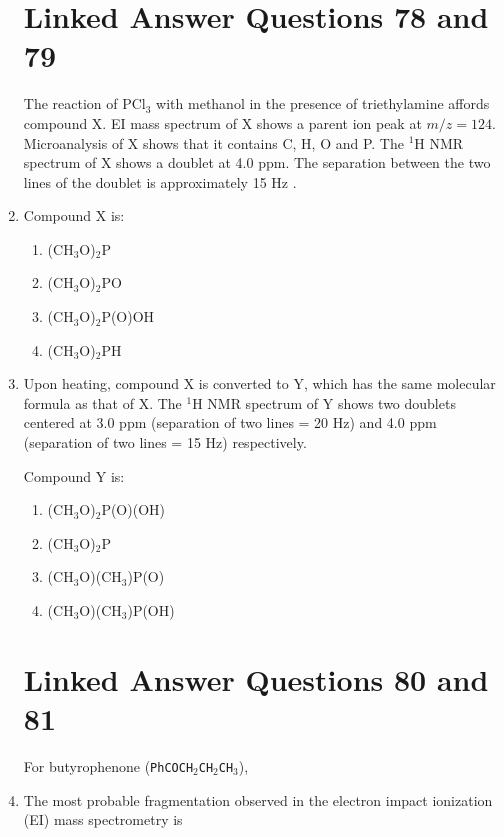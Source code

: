 \documentclass[12pt]{article}
\begin{document}
\begin{enumerate}
\section*{Linked Answer Questions 78 and 79}

The reaction of PCl$_3$ with methanol in the presence of triethylamine affords compound X. EI mass spectrum of X shows a parent ion peak at $m/z = 124$. Microanalysis of X shows that it contains C, H, O and P. The $^1$H NMR spectrum of X shows a doublet at 4.0 ppm. The separation between the two lines of the doublet is approximately 15 Hz .



    \item Compound X is:
    \begin{enumerate}
        \item (CH$_3$O)$_2$P
        \item (CH$_3$O)$_2$PO
        \item (CH$_3$O)$_2$P(O)OH
        \item (CH$_3$O)$_2$PH
    \end{enumerate}    \hfill{}


    \item Upon heating, compound X is converted to Y, which has the same molecular formula as that of X. The $^1$H NMR spectrum of Y shows two doublets centered at 3.0 ppm (separation of two lines = 20 Hz) and 4.0 ppm (separation of two lines = 15 Hz) respectively.

    Compound Y is:
    \begin{enumerate}
        \item (CH$_3$O)$_2$P(O)(OH)
        \item (CH$_3$O)$_2$P
        \item (CH$_3$O)(CH$_3$)P(O)
        \item (CH$_3$O)(CH$_3$)P(OH)
    \end{enumerate}
   \hfill{}


\section*{Linked Answer Questions 80 and 81}

For butyrophenone (\texttt{PhCOCH\(_2\)CH\(_2\)CH\(_3\)}),

\item  The most probable fragmentation observed in the electron impact ionization (EI) mass spectrometry is


\end{enumerate}
\end{document}
